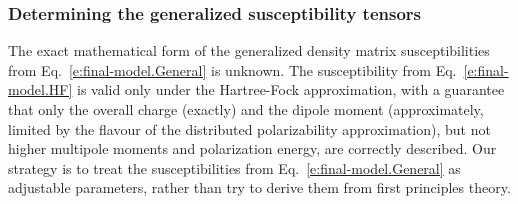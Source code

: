 \documentclass[aip,amsmath,amssymb,reprint,floatfix]{revtex4-1}
\begin{document}
\subsubsection{Determining the generalized susceptibility tensors}

The exact mathematical form of the generalized density matrix susceptibilities 
from Eq.~\eqref{e:final-model.General} is unknown. 
The susceptibility from Eq.~\eqref{e:final-model.HF} is valid only under the Hartree\hyp{}Fock
approximation, with a guarantee that only the overall charge (exactly) and the dipole moment (approximately,
limited by the flavour of the distributed polarizability approximation), 
but not higher multipole moments and polarization energy, are correctly described.
Our strategy is to treat the susceptibilities from Eq.~\eqref{e:final-model.General}
as adjustable parameters, rather than try to derive them from first principles theory.
\end{document}
